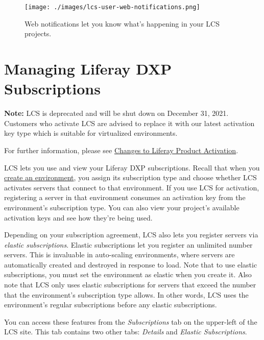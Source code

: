 \begin{figure}
\centering
\texttt{[image: ./images/lcs-user-web-notifications.png]}
\caption{Web notifications let you know what's happening in your LCS
projects.}
\end{figure}

\chapter{Managing Liferay DXP
Subscriptions}\label{managing-liferay-dxp-subscriptions}

\noindent\hrulefill

\textbf{Note:} LCS is deprecated and will be shut down on December 31,
2021. Customers who activate LCS are advised to replace it with our
latest activation key type which is suitable for virtualized
environments.

For further information, please see
\href{https://help.liferay.com/hc/en-us/articles/4402347960845-Changes-to-Liferay-Product-Activation}{Changes
to Liferay Product Activation}.

\noindent\hrulefill

LCS lets you use and view your Liferay DXP subscriptions. Recall that
when you
\href{/docs/7-2/deploy/-/knowledge_base/d/managing-lcs-environments\#creating-environments}{create
an environment}, you assign its subscription type and choose whether LCS
activates servers that connect to that environment. If you use LCS for
activation, registering a server in that environment consumes an
activation key from the environment's subscription type. You can also
view your project's available activation keys and see how they're being
used.

Depending on your subscription agreement, LCS also lets you register
servers via \emph{elastic subscriptions}. Elastic subscriptions let you
register an unlimited number servers. This is invaluable in auto-scaling
environments, where servers are automatically created and destroyed in
response to load. Note that to use elastic subscriptions, you must set
the environment as elastic when you create it. Also note that LCS only
uses elastic subscriptions for servers that exceed the number that the
environment's subscription type allows. In other words, LCS uses the
environment's regular subscriptions before any elastic subscriptions.

You can access these features from the \emph{Subscriptions} tab on the
upper-left of the LCS site. This tab contains two other tabs:
\emph{Details} and \emph{Elastic Subscriptions}.

